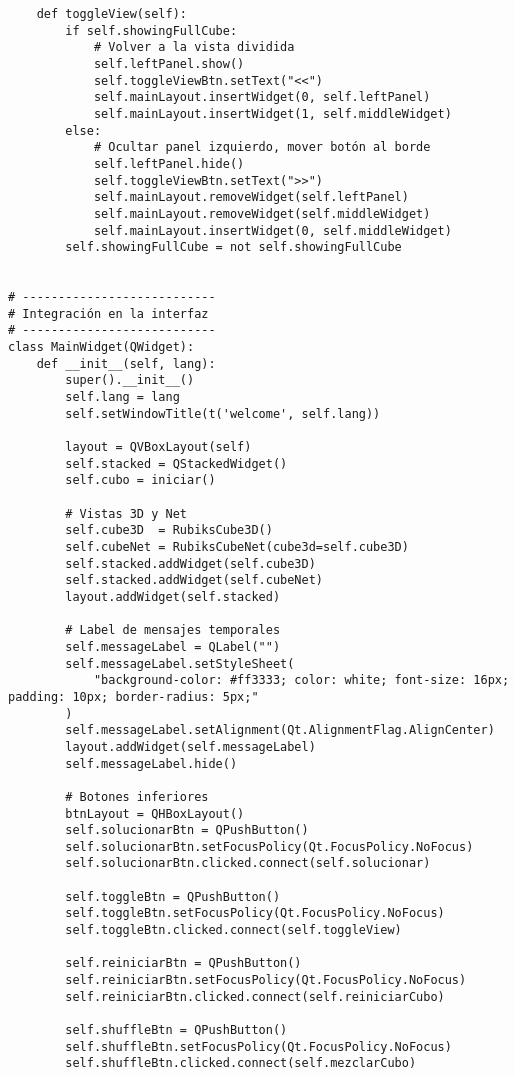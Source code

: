 \begin{lstlisting}
    def toggleView(self):
        if self.showingFullCube:
            # Volver a la vista dividida
            self.leftPanel.show()
            self.toggleViewBtn.setText("<<")
            self.mainLayout.insertWidget(0, self.leftPanel)
            self.mainLayout.insertWidget(1, self.middleWidget)
        else:
            # Ocultar panel izquierdo, mover botón al borde
            self.leftPanel.hide()
            self.toggleViewBtn.setText(">>")
            self.mainLayout.removeWidget(self.leftPanel)
            self.mainLayout.removeWidget(self.middleWidget)
            self.mainLayout.insertWidget(0, self.middleWidget)
        self.showingFullCube = not self.showingFullCube


# ---------------------------
# Integración en la interfaz
# ---------------------------
class MainWidget(QWidget):
    def __init__(self, lang):
        super().__init__()
        self.lang = lang
        self.setWindowTitle(t('welcome', self.lang))  

        layout = QVBoxLayout(self)
        self.stacked = QStackedWidget()
        self.cubo = iniciar()

        # Vistas 3D y Net
        self.cube3D  = RubiksCube3D()
        self.cubeNet = RubiksCubeNet(cube3d=self.cube3D)
        self.stacked.addWidget(self.cube3D)
        self.stacked.addWidget(self.cubeNet)
        layout.addWidget(self.stacked)

        # Label de mensajes temporales
        self.messageLabel = QLabel("")
        self.messageLabel.setStyleSheet(
            "background-color: #ff3333; color: white; font-size: 16px; padding: 10px; border-radius: 5px;"
        )
        self.messageLabel.setAlignment(Qt.AlignmentFlag.AlignCenter)
        layout.addWidget(self.messageLabel)
        self.messageLabel.hide()

        # Botones inferiores
        btnLayout = QHBoxLayout()
        self.solucionarBtn = QPushButton()
        self.solucionarBtn.setFocusPolicy(Qt.FocusPolicy.NoFocus)
        self.solucionarBtn.clicked.connect(self.solucionar)

        self.toggleBtn = QPushButton()
        self.toggleBtn.setFocusPolicy(Qt.FocusPolicy.NoFocus)
        self.toggleBtn.clicked.connect(self.toggleView)

        self.reiniciarBtn = QPushButton()
        self.reiniciarBtn.setFocusPolicy(Qt.FocusPolicy.NoFocus)
        self.reiniciarBtn.clicked.connect(self.reiniciarCubo)

        self.shuffleBtn = QPushButton()
        self.shuffleBtn.setFocusPolicy(Qt.FocusPolicy.NoFocus)
        self.shuffleBtn.clicked.connect(self.mezclarCubo)


\end{lstlisting}
